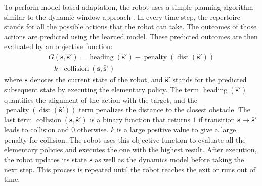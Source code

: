 To perform model-based adaptation, the robot uses a simple planning algorithm similar to the dynamic window approach \cite{DWA}.
In every time-step, the repertoire stands for all the possible actions that the robot can take.
The outcomes of those actions are predicted using the learned model.
These predicted outcomes are then evaluated by an objective function:
\begin{equation}
\begin{gathered}
G(\bm{s}, \hat{\bm{s}}') = \operatorname{heading}(\hat{\bm{s}}') - 
\operatorname{penalty}(\operatorname{dist}(\hat{\bm{s}}')) \\
- k \cdot \operatorname{collision}(\bm{s}, \hat{\bm{s}}')
\end{gathered}
\label{objective_function}
\end{equation}
where $\bm{s}$ denotes the current state of the robot, and $\hat{\bm{s}}'$ stands for the predicted subsequent state by executing the elementary policy.
The term $\operatorname{heading}(\hat{\bm{s}}')$ quantifies the alignment of the action with the target, and the $\operatorname{penalty}(\operatorname{dist}(\hat{\bm{s}}'))$ term penalizes the distance to the closest obstacle.
The last term $\operatorname{collision}(\bm{s}, \hat{\bm{s}}')$ is a binary function that returns $1$ if transition $\bm{s} \rightarrow \hat{\bm{s}}'$ leads to collision and $0$ otherwise.
$k$ is a large positive value to give a large penalty for collision.
The robot uses this objective function to evaluate all the elementary policies and executes the one with the highest result.
After execution, the robot updates its state $\bm{s}$ as well as the dynamics model before taking the next step.
This process is repeated until the robot reaches the exit or runs out of time.



